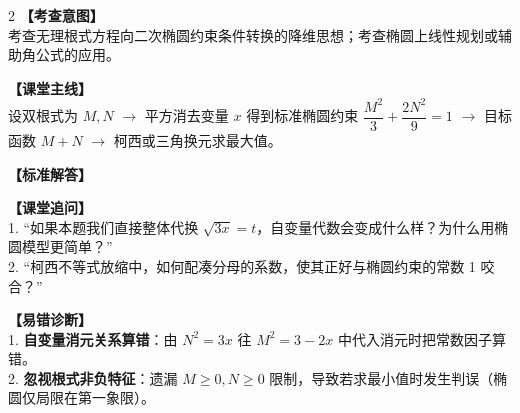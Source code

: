 \documentclass[12pt,a4paper]{ctexart}
\begin{document}
\vspace{0.8em}
\par{}
\vspace{0.8em}

\begin{minipage}[t]{0.7\textwidth}
  \vspace{0pt}
  \qFourStem
  \qFourOptions
\end{minipage}
\hfill
\begin{minipage}[t]{0.26\textwidth}
  \vspace{0pt}
  \hfill
  \qFourFigure[0.85]
\end{minipage}

\vspace{0.8em}

\begin{paracol}{2}
  \textbf{【考查意图】}\\
  考查无理根式方程向二次椭圆约束条件转换的降维思想；考查椭圆上线性规划或辅助角公式的应用。
  
  \textbf{【课堂主线】}\\
  设双根式为 \(M, N\) \(\to\) 平方消去变量 \(x\) 得到标准椭圆约束 \(\dfrac{M^2}{3}+\dfrac{2N^2}{9}=1\) \(\to\) 目标函数 \(M+N\) \(\to\) 柯西或三角换元求最大值。
  
  \textbf{【标准解答】}\\
  \qFourSolution
  
  \textbf{【课堂追问】}\\
  1. “如果本题我们直接整体代换 \(\sqrt{3x} = t\)，自变量代数会变成什么样？为什么用椭圆模型更简单？”\\
  2. “柯西不等式放缩中，如何配凑分母的系数，使其正好与椭圆约束的常数 1 咬合？”
  
  \switchcolumn
  \textbf{【易错诊断】}\\
  1. \textbf{自变量消元关系算错}：由 \(N^2 = 3x\) 往 \(M^2 = 3 - 2x\) 中代入消元时把常数因子算错。\\
  2. \textbf{忽视根式非负特征}：遗漏 \(M \geqslant 0, N \geqslant 0\) 限制，导致若求最小值时发生判误（椭圆仅局限在第一象限）。
\end{paracol}

\vspace{0.8em}
\par{}
\vspace{0.8em}

\newpage

{\small
\qFiveStem
}
\end{document}
